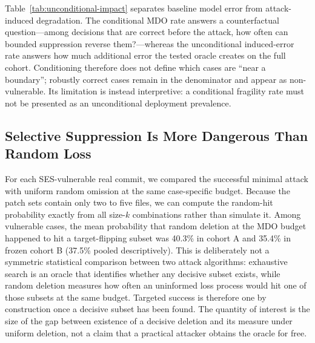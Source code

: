 \documentclass[journal,compsoc]{IEEEtran}
\begin{document}
\begin{table}[t]
\centering
\caption{Unconditional attack impact. ``Induced'' counts cases that are correct with complete evidence but enter the attacker-preferred state after suppression. ``Oracle target'' additionally includes cases already in that state at baseline, for which the adversary may choose zero deletions.}
\label{tab:unconditional-impact}
\small
{}
\end{table}

Table~\ref{tab:unconditional-impact} separates baseline model error from attack-induced degradation. The conditional MDO rate answers a counterfactual question---among decisions that are correct before the attack, how often can bounded suppression reverse them?---whereas the unconditional induced-error rate answers how much additional error the tested oracle creates on the full cohort. Conditioning therefore does not define which cases are ``near a boundary''; robustly correct cases remain in the denominator and appear as non-vulnerable. Its limitation is instead interpretive: a conditional fragility rate must not be presented as an unconditional deployment prevalence.

\subsection{Selective Suppression Is More Dangerous Than Random Loss}
For each SES-vulnerable real commit, we compared the successful minimal attack with uniform random omission at the same case-specific budget. Because the patch sets contain only two to five files, we can compute the random-hit probability exactly from all size-$k$ combinations rather than simulate it. Among vulnerable cases, the mean probability that random deletion at the MDO budget happened to hit a target-flipping subset was 40.3\% in cohort A and 35.4\% in frozen cohort B (37.5\% pooled descriptively). This is deliberately not a symmetric statistical comparison between two attack algorithms: exhaustive search is an oracle that identifies whether any decisive subset exists, while random deletion measures how often an uninformed loss process would hit one of those subsets at the same budget. Targeted success is therefore one by construction once a decisive subset has been found. The quantity of interest is the size of the gap between existence of a decisive deletion and its measure under uniform deletion, not a claim that a practical attacker obtains the oracle for free.
\end{document}
